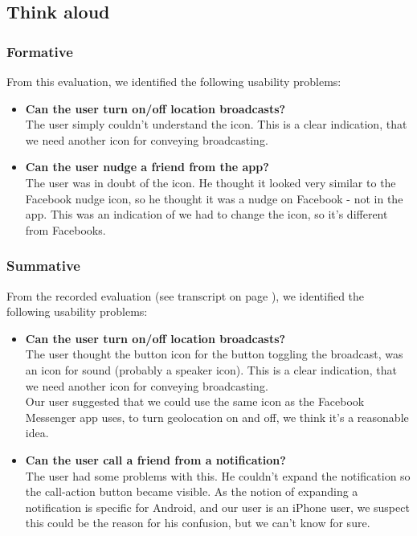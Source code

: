 \documentclass[runningheads,a4paper]{llncs}
\begin{document}
\subsection*{Think aloud}

\subsubsection*{Formative}
From this evaluation, we identified the following usability problems:
\begin{itemize}
\item \textbf{Can the user turn on/off location broadcasts?}\\
	The user simply couldn't understand the icon. This is a clear indication, that we need another icon for conveying broadcasting. \\
\item \textbf{Can the user nudge a friend from the app?}\\
The user was in doubt of the icon. He thought it looked very similar to the Facebook nudge icon, so he thought it was a nudge on Facebook - not in the app. This was an indication of we had to change the icon, so it's different from Facebooks. 
\end{itemize}

\subsubsection*{Summative}

From the recorded evaluation (see transcript on page \pageref{transcript}), we identified the following usability problems:

\begin{itemize}
\item \textbf{Can the user turn on/off location broadcasts?}\\
	The user thought the button icon for the button toggling the broadcast, was an icon for sound (probably a speaker icon). This is a clear indication, that we need another icon for conveying broadcasting. \\
	Our user suggested that we could use the same icon as the Facebook Messenger app uses, to turn geolocation on and off, we think it's a reasonable idea. 
\item \textbf{Can the user call a friend from a notification?}\\
	The user had some problems with this. He couldn't expand the notification so the call-action button became visible. 
As the notion of expanding a notification is specific for Android, and our user is an iPhone user, we suspect this could be the reason for his confusion, but we can't know for sure.
\end{itemize}
\end{document}

